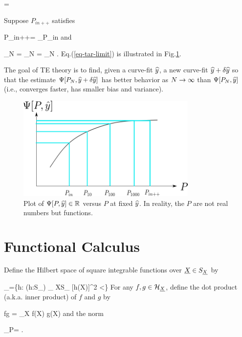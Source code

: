 \beq
{}=
\eeq


Suppose $P_{in++}$ satisfies


\beq
P_{in++}= \argmin_{P_{in}}\call[P_{in}, \haty]
\eeq
and

\beq
\lim_{N\rarrow \infty}
=
\lim_{N\rarrow \infty}
=
\lim_{N\rarrow \infty}
\Psi[P_N, \haty]
\label{eq-tar-limit}
\;.
\eeq
Eq.(\ref{eq-tar-limit}) is illustrated in
Fig.\ref{fig-targeted-p-psi-plot.png}.

The goal of TE theory
is to find, given a curve-fit ${\widehat{y}}$,
a new curve-fit ${\widehat{y}} +\delta {\widehat{y}}$
so that the
estimate $\Psi[P_N, {\widehat{y}}+\delta {\widehat{y}}]$
has better behavior as $N\rightarrow \infty$ than
$\Psi[P_N, {\widehat{y}}]$ (i.e., converges faster,
has smaller bias and variance).


\begin{figure}[h!]
\centering
\includegraphics[width=3.5in]
{targeted-est/targeted-p-psi-plot.png}
\caption{
Plot of $\Psi[P, {\widehat{y}}]\in { \mathbb{R}}$ versus $P$
at fixed ${\widehat{y}}$.
In reality, the $P$ are not real numbers but
functions.
}
\label{fig-targeted-p-psi-plot.png}
\end{figure}


\section{Functional Calculus}

Define
the Hilbert space of square integrable functions over ${\underline{X}}\in S_{\underline{X}}$
by

\beq
\calh_\rvX =\{h: (h:S_\rvX\rarrow \RR) 
\sum_{ X\in S_ \rvX}[h(X)]^2 <\infty\}
\eeq
For any $f,g\in {\cal H}_{\underline{X}}$,
define the dot product (a.k.a. inner product)
of $f$ and $g$ by

\beq
f\cdot g = \sum_X f(X) g(X)
\eeq
and the norm

\beq
{}_P= 
\;.
\eeq

